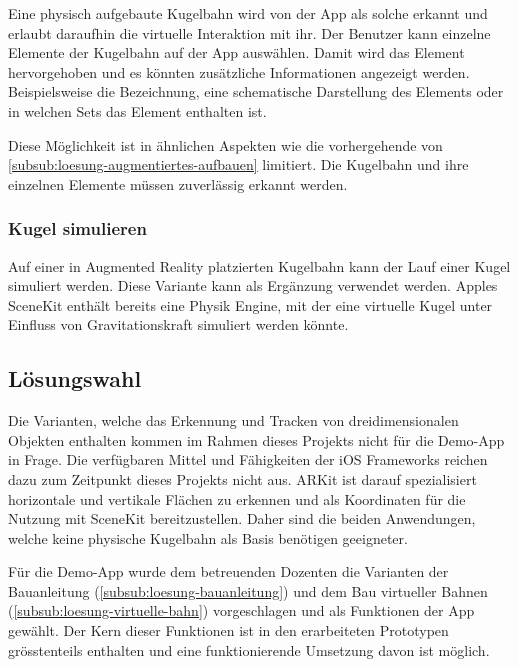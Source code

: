 Eine physisch aufgebaute Kugelbahn wird von der App als solche erkannt und erlaubt daraufhin die virtuelle Interaktion mit ihr.
Der Benutzer kann einzelne Elemente der Kugelbahn auf der App auswählen.
Damit wird das Element hervorgehoben und es könnten zusätzliche Informationen angezeigt werden.
Beispielsweise die Bezeichnung, eine schematische Darstellung des Elements oder in welchen Sets das Element enthalten ist.

Diese Möglichkeit ist in ähnlichen Aspekten wie die vorhergehende von \ref{subsub:loesung-augmentiertes-aufbauen} limitiert.
Die Kugelbahn und ihre einzelnen Elemente müssen zuverlässig erkannt werden.

\subsubsection{Kugel simulieren}

Auf einer in Augmented Reality platzierten Kugelbahn kann der Lauf einer Kugel simuliert werden.
Diese Variante kann als Ergänzung verwendet werden.
Apples SceneKit enthält bereits eine Physik Engine, mit der eine virtuelle Kugel unter Einfluss von Gravitationskraft simuliert werden könnte. 

\subsection{Lösungswahl}

Die Varianten, welche das Erkennung und Tracken von dreidimensionalen Objekten enthalten kommen im Rahmen dieses Projekts nicht für die Demo-App in Frage.
Die verfügbaren Mittel und Fähigkeiten der iOS Frameworks reichen dazu zum Zeitpunkt dieses Projekts nicht aus.
ARKit ist darauf spezialisiert horizontale und vertikale Flächen zu erkennen und als Koordinaten für die Nutzung mit SceneKit bereitzustellen.
Daher sind die beiden Anwendungen, welche keine physische Kugelbahn als Basis benötigen geeigneter.

Für die Demo-App wurde dem betreuenden Dozenten die Varianten der Bauanleitung (\ref{subsub:loesung-bauanleitung}) und dem Bau virtueller Bahnen (\ref{subsub:loesung-virtuelle-bahn}) vorgeschlagen und als Funktionen der App gewählt.
Der Kern dieser Funktionen ist in den erarbeiteten Prototypen grösstenteils enthalten und eine funktionierende Umsetzung davon ist möglich.
